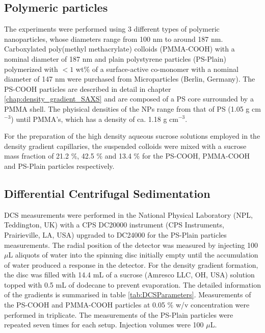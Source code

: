 \subsection{Polymeric particles}

The experiments were performed using 3 different types of polymeric nanoparticles, whose diameters range from 100 nm to around 187 nm. Carboxylated poly(methyl methacrylate) colloids (PMMA-COOH) with a nominal diameter of 187 nm and plain polystyrene particles (PS-Plain) polymerized with $<1$ wt$\%$ of a surface-active co-monomer with a nominal diameter of 147 nm were purchased from Microparticles (Berlin, Germany). The PS-COOH particles are described in detail in chapter \ref{chap:density_gradient_SAXS} and are composed of a PS core surrounded by a PMMA shell. The phyisical densities of the NPs range from that of PS (1.05 g cm$^{-3}$) until PMMA's, which has a density of ca. 1.18 g cm$^{-3}$.

For the preparation of the high density aqueous sucrose solutions employed in the density gradient capillaries, the suspended colloids were mixed with a sucrose mass fraction of 21.2 $\%$, 42.5 $\%$ and 13.4 $\%$ for the PS-COOH, PMMA-COOH and PS-Plain particles respectively.


\subsection{Differential Centrifugal Sedimentation}
\label{sec:DCS_experimental}
DCS measurements were performed in the National Physical Laboratory (NPL, Teddington, UK) with a CPS DC20000 instrument (CPS Instruments, Prairieville, LA, USA) upgraded to DC24000 for the PS-Plain particles measurements. The radial position of the detector was measured by injecting 100 $\mu$L aliquots of water into the spinning disc initially empty until the accumulation of water produced a response in the detector. For the density gradient formation, the disc was filled with 14.4 mL of a sucrose (Amresco LLC, OH, USA) solution topped with 0.5 mL of dodecane to prevent evaporation. The detailed information of the gradients is summarised in table \ref{tab:DCSParameters}. Measurements of the PS-COOH and PMMA-COOH particles at 0.05 \% w/v concentration were performed in triplicate. The measurements of the PS-Plain particles were repeated seven times for each setup. Injection volumes were 100 $\mu$L. 

